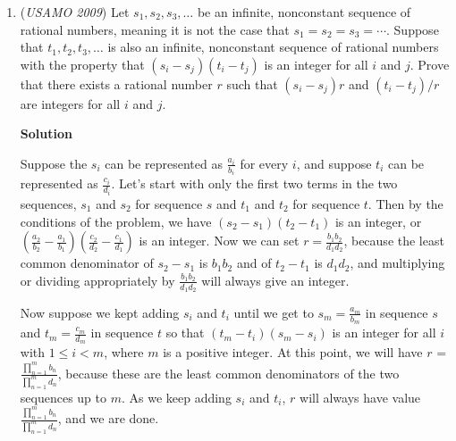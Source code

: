 \begin{enumerate}
 \textbf{Only If}:

 Consider the same setup, except $Q$ is no longer the midpoint of $\overset{\frown}{DC}$. Note that $TV$ must be parallel to $RG$ in order for $PQRS$  to be cyclic. We claim that $S' = S$ and hope to reach a contradiction. Pascal's theorem on the tuple $(V, P, A, C, B, Q)$ implies that $S'$, $R'$, and $G = PA \cap BQ$ are collinear. However, there exists a unique point $Q$ such that $HQ$, $AC$, and $RG$ are concurrent. By \textbf{If}, $Q$ must be the midpoint of $\overset{\frown}{DC}$ in order for the concurrency to occur; hence, $R' \notin RS$. Then $R'G \cap BC = S' \neq S$, since $RG \cap BC = S$. However, this is a contradiction, so therefore $TV$ cannot be parallel to $RG$ and $PQRS$ is not cyclic.

 Solution by \textbf{TheBoomBox77}

 


	\item (\textit{USAMO 2009}) Let $s_1, s_2, s_3, \ldots$ be an infinite, nonconstant sequence of rational numbers, meaning it is not the case that $s_1 = s_2 = s_3 = \cdots.$  Suppose that $t_1, t_2, t_3, \ldots$ is also an infinite, nonconstant sequence of rational numbers with the property that $(s_i - s_j)(t_i - t_j)$ is an integer for all $i$ and $j$.  Prove that there exists a rational number $r$ such that $(s_i - s_j)r$ and $(t_i - t_j)/r$ are integers for all $i$ and $j$.


 



\textbf{Solution}

Suppose the $s_i$ can be represented as $\frac{a_i}{b_i}$ for every $i$, and suppose $t_i$ can be represented as $\frac{c_i}{d_i}$. Let's start with only the first two terms in the two sequences, $s_1$ and $s_2$ for sequence $s$ and $t_1$ and $t_2$ for sequence $t$. Then by the conditions of the problem, we have $(s_2 - s_1)(t_2 - t_1)$ is an integer, or $(\frac{a_2}{b_2} - \frac{a_1}{b_1})(\frac{c_2}{d_2} - \frac{c_1}{d_1})$ is an integer. Now we can set $r = \frac{b_1 b_2}{d_1 d_2}$, because the least common denominator of $s_2 - s_1$ is $b_1 b_2$ and of $t_2 - t_1$ is $d_1 d_2$, and multiplying or dividing appropriately by $\frac{b_1 b_2}{d_1 d_2}$ will always give an integer. 

 Now suppose we kept adding $s_i$ and $t_i$ until we get to $s_m = \frac{a_m}{b_m}$ in sequence $s$ and $t_m = \frac{c_m}{d_m}$ in sequence $t$ so that $(t_m - t_i)(s_m - s_i)$ is an integer for all $i$ with $1 \le i < m$, where $m$ is a positive integer. At this point, we will have $r$ = $\frac{\prod_{n=1}^{m}b_n}{\prod_{n=1}^{m}d_n}$, because these are the least common denominators of the two sequences up to $m$. As we keep adding $s_i$ and $t_i$, $r$ will always have value $\frac{\prod_{n=1}^{m}b_n}{\prod_{n=1}^{m}d_n}$, and we are done.

 


\end{enumerate}
